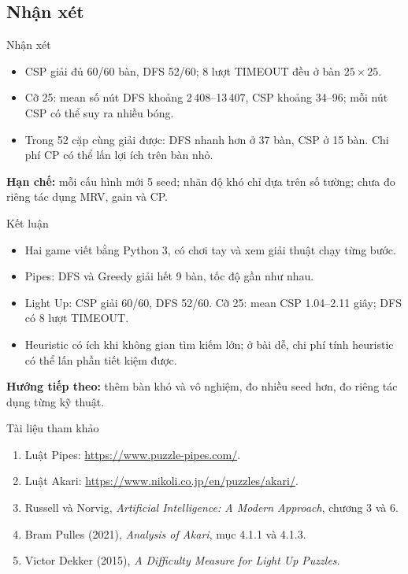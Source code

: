 \documentclass[aspectratio=169,11pt]{beamer}
\newcommand{\slidenote}[1]{\par\vspace{2mm}{\scriptsize\color{muted}#1\par}}
\begin{document}
\subsection{Nhận xét}
\begin{frame}{Nhận xét}
\begin{itemize}
\item CSP giải đủ 60/60 bàn, DFS 52/60; 8 lượt TIMEOUT đều ở bàn $25\times25$.
\item Cỡ 25: mean số nút DFS khoảng 2\,408--13\,407, CSP khoảng 34--96; mỗi nút CSP có thể suy ra nhiều bóng.
\item Trong 52 cặp cùng giải được: DFS nhanh hơn ở 37 bàn, CSP ở 15 bàn. Chi phí CP có thể lấn lợi ích trên bàn nhỏ.
\end{itemize}
\vspace{3mm}\textbf{Hạn chế:} mỗi cấu hình mới 5 seed; nhãn độ khó chỉ dựa trên số tường; chưa đo riêng tác dụng MRV, gain và CP.
\end{frame}

\HCMUTgamefalse
\begin{frame}{Kết luận}
\begin{itemize}
\item Hai game viết bằng Python 3, có chơi tay và xem giải thuật chạy từng bước.
\item Pipes: DFS và Greedy giải hết 9 bàn, tốc độ gần như nhau.
\item Light Up: CSP giải 60/60, DFS 52/60. Cỡ 25: mean CSP 1.04--2.11 giây; DFS có 8 lượt TIMEOUT.
\item Heuristic có ích khi không gian tìm kiếm lớn; ở bài dễ, chi phí tính heuristic có thể lấn phần tiết kiệm được.
\end{itemize}
\vspace{3mm}\textbf{Hướng tiếp theo:} thêm bàn khó và vô nghiệm, đo nhiều seed hơn, đo riêng tác dụng từng kỹ thuật.
\end{frame}

\begin{frame}{Tài liệu tham khảo}
\small
\begin{enumerate}
\item Luật Pipes: \url{https://www.puzzle-pipes.com/}.
\item Luật Akari: \url{https://www.nikoli.co.jp/en/puzzles/akari/}.
\item Russell và Norvig, \emph{Artificial Intelligence: A Modern Approach}, chương 3 và 6.
\item Bram Pulles (2021), \emph{Analysis of Akari}, mục 4.1.1 và 4.1.3.
\item Victor Dekker (2015), \emph{A Difficulty Measure for Light Up Puzzles}.
\end{enumerate}
\slidenote{Danh sách đầy đủ trong báo cáo.}
\end{frame}
\end{document}
